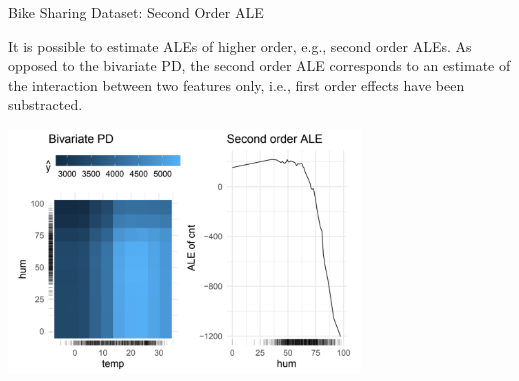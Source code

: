 
\begin{vbframe}{Bike Sharing Dataset: Second Order ALE}

It is possible to estimate ALEs of higher order, e.g., second order ALEs. As opposed to the bivariate PD, the second order ALE corresponds to an estimate of the interaction between two features only, i.e., first order effects have been substracted.

\vspace{0.1cm}

\begin{center}
\includegraphics[width=0.7\textwidth]{figure_man/second-order.png}
\end{center}

\end{vbframe}


\endlecture

